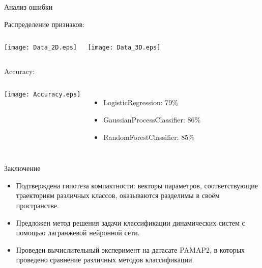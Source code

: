 \documentclass{beamer}
\begin{document}

\begin{frame}{Анализ ошибки}

    Распределение признаков:

        \begin{columns}[c]
        
                \texttt{[image: Data\_2D.eps]}
                
                \centering
                \texttt{[image: Data\_3D.eps]}
                
        \end{columns}

        Accuracy:

        \begin{columns}[c]
        
                \texttt{[image: Accuracy.eps]}
                
                    \begin{itemize}

                        \item LogisticRegression: 79$\%$

                        \item GaussianProcessClassifier: $86\%$

                        \item RandomForestClassifier: $85\%$

                    \end{itemize}
                
        \end{columns}


\end{frame}


\begin{frame}{Заключение}

    \begin{itemize}

        \item Подтверждена гипотеза компактности: векторы параметров, соответствующие траекториям различных классов, оказываются разделимы в своём пространстве.
    
        \item Предложен метод решения задачи классификации динамических систем с помощью лагранжевой нейронной сети.
        
        \item Проведен вычислительный эксперимент на датасате PAMAP2, в которых проведено сравнение различных методов классификации.

    \end{itemize}
    
\end{frame}
\end{document}
